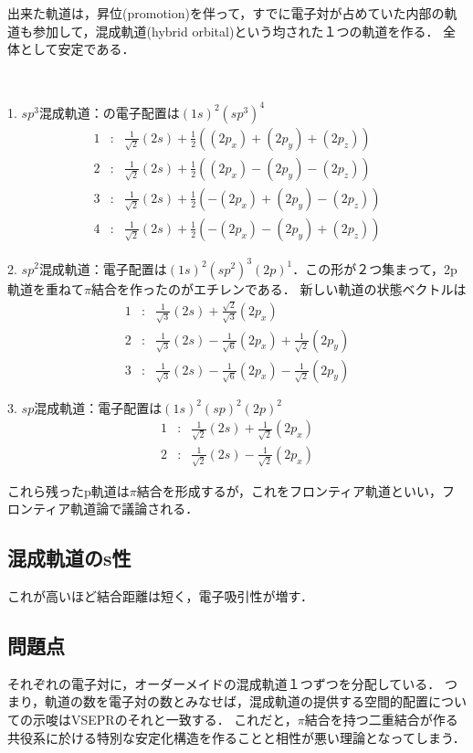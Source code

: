 \documentclass[uplatex, dvipdfmx]{jsreport}
\begin{document}
出来た軌道は，昇位(promotion)を伴って，すでに電子対が占めていた内部の軌道も参加して，混成軌道(hybrid orbital)という均された１つの軌道を作る．
全体として安定である．

\begin{example}　

    1. $sp^3$混成軌道：の電子配置は$(1s)^2(sp^3)^4$
    \begin{eqnarray*}
        1&:& \frac{1}{\sqrt{2}}(2s)+\frac{1}{2}((2p_x)+(2p_y)+(2p_z)) \\
        2&:& \frac{1}{\sqrt{2}}(2s)+\frac{1}{2}((2p_x)-(2p_y)-(2p_z))\\
        3&:& \frac{1}{\sqrt{2}}(2s)+\frac{1}{2}(-(2p_x)+(2p_y)-(2p_z))\\
        4&:& \frac{1}{\sqrt{2}}(2s)+\frac{1}{2}(-(2p_x)-(2p_y)+(2p_z))
    \end{eqnarray*}

    2. $sp^2$混成軌道：電子配置は$(1s)^2(sp^2)^3(2p)^1$．この形が２つ集まって，2p軌道を重ねて$\pi$結合を作ったのがエチレンである．
    新しい軌道の状態ベクトルは\begin{eqnarray*}
        1&:& \frac{1}{\sqrt{3}}(2s)+\frac{\sqrt{2}}{\sqrt{3}}(2p_x) \\
        2&:& \frac{1}{\sqrt{3}}(2s)-\frac{1}{\sqrt{6}}(2p_x)+\frac{1}{\sqrt{2}}(2p_y)\\
        3&:& \frac{1}{\sqrt{3}}(2s)-\frac{1}{\sqrt{6}}(2p_x)-\frac{1}{\sqrt{2}}(2p_y)
    \end{eqnarray*}
    
    3. $sp$混成軌道：電子配置は$(1s)^2(sp)^2(2p)^2$
    \begin{eqnarray*}
        1&:& \frac{1}{\sqrt{2}}(2s)+\frac{1}{\sqrt{2}}(2p_x) \\
        2&:& \frac{1}{\sqrt{2}}(2s)-\frac{1}{\sqrt{2}}(2p_x)
    \end{eqnarray*}
\end{example}
これら残ったp軌道は$\pi$結合を形成するが，これをフロンティア軌道といい，フロンティア軌道論で議論される．

\subsection*{混成軌道のs性}
これが高いほど結合距離は短く，電子吸引性が増す．

\subsection*{問題点}
それぞれの電子対に，オーダーメイドの混成軌道１つずつを分配している．
つまり，軌道の数を電子対の数とみなせば，混成軌道の提供する空間的配置についての示唆はVSEPRのそれと一致する．
これだと，$\pi$結合を持つ二重結合が作る共役系に於ける特別な安定化構造を作ることと相性が悪い理論となってしまう．
\end{document}
